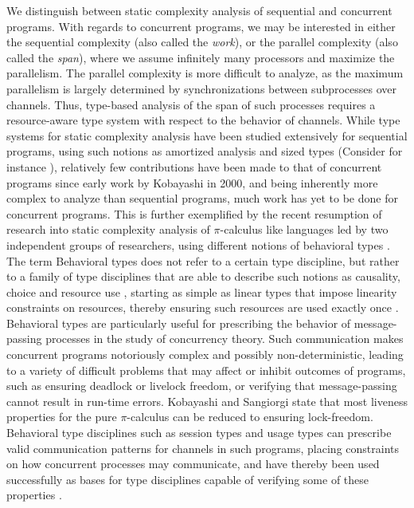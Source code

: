 We distinguish between static complexity analysis of sequential and concurrent programs. With regards to concurrent programs, we may be interested in either the sequential complexity (also called the \textit{work}), or the parallel complexity (also called the \textit{span}), where we assume infinitely many processors and maximize the parallelism. The parallel complexity is more difficult to analyze, as the maximum parallelism is largely determined by synchronizations between subprocesses over channels. Thus, type-based analysis of the span of such processes requires a resource-aware type system with respect to the behavior of channels. While type systems for static complexity analysis have been studied extensively for sequential programs, using such notions as amortized analysis and sized types (Consider for instance \cite{AvanziniLago2017,LagoGaboardi2012,Hofmann2003,Hoffmann2010}), relatively few contributions have been made to that of concurrent programs since early work by Kobayashi \cite{Kobayashi2000} in 2000, and being inherently more complex to analyze than sequential programs, much work has yet to be done for concurrent programs. This is further exemplified by the recent resumption of research into static complexity analysis of $\pi$-calculus like languages led by two independent groups of researchers, using different notions of behavioral types \cite{BaillotGhyselen2021,BaillotEtAl2021,DasEtAl2018}. \\

The term Behavioral types does not refer to a certain type discipline, but rather to a family of type disciplines that are able to describe such notions as causality, choice and resource use \cite{Huttel2016}, starting as simple as linear types that impose linearity constraints on resources, thereby ensuring such resources are used exactly once \cite{KobayashiPierce1999}. Behavioral types are particularly useful for prescribing the behavior of message-passing processes in the study of concurrency theory. Such communication makes concurrent programs notoriously complex and possibly non-deterministic, leading to a variety of difficult problems that may affect or inhibit outcomes of programs, such as ensuring deadlock or livelock freedom, or verifying that message-passing cannot result in run-time errors. Kobayashi and Sangiorgi \cite{KobayashiSangiorgi2010} state that most liveness properties for the pure $\pi$-calculus can be reduced to ensuring lock-freedom. Behavioral type disciplines such as session types \cite{Honda1993,HondaEtAl1998} and usage types \cite{SumiiKobayashi1998} can prescribe valid communication patterns for channels in such programs, placing constraints on how concurrent processes may communicate, and have thereby been used successfully as bases for type disciplines capable of verifying some of these properties \cite{Kobayashi2000,Kobayashi2002,DardhaGay2018}.\\

